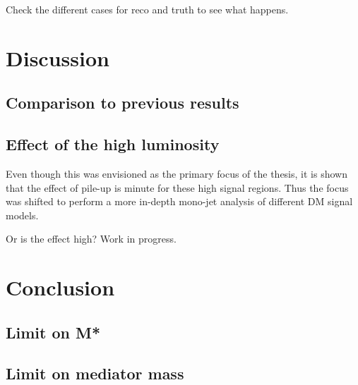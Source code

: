 Check the different cases for reco and truth to see what happens.


\newpage
\section{Discussion}
\subsection{Comparison to previous results}
\subsection{Effect of the high luminosity}\label{subsec:hleff}

Even though this was envisioned as the primary focus of the thesis, it is shown that the effect of pile-up is minute for these high signal regions. Thus the focus was shifted to perform a more in-depth mono-jet analysis of different DM signal models.

Or is the effect high? Work in progress.

\newpage
\section{Conclusion}
\subsection{Limit on M*}
\subsection{Limit on mediator mass}